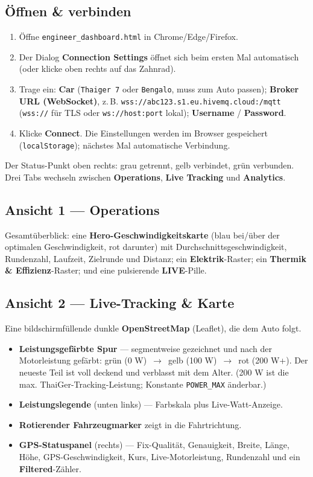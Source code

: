 \documentclass[11pt,a4paper,oneside]{report}
\newcommand{\arrow}{\,$\rightarrow$\,}
\newcommand{\code}[1]{\texttt{#1}}
\begin{document}
\subsection{\"Offnen \& verbinden}
\begin{enumerate}
  \item \"Offne \code{engineer\_dashboard.html} in Chrome/Edge/Firefox.
  \item Der Dialog \textbf{Connection Settings} \"offnet sich beim ersten Mal
    automatisch (oder klicke oben rechts auf das Zahnrad).
  \item Trage ein: \textbf{Car} (\code{Thaiger 7} oder \code{Bengalo}, muss zum
    Auto passen); \textbf{Broker URL (WebSocket)}, z.\,B.
    \code{wss://abc123.s1.eu.hivemq.cloud:/mqtt} (\code{wss://} f\"ur TLS oder
    \code{ws://host:port} lokal); \textbf{Username} / \textbf{Password}.
  \item Klicke \textbf{Connect}. Die Einstellungen werden im Browser gespeichert
    (\code{localStorage}); n\"achstes Mal automatische Verbindung.
\end{enumerate}
Der Status-Punkt oben rechts: grau getrennt, gelb verbindet, gr\"un verbunden. Drei
Tabs wechseln zwischen \textbf{Operations}, \textbf{Live Tracking} und
\textbf{Analytics}.

\subsection{Ansicht 1 --- Operations}
Gesamt\"uberblick: eine \textbf{Hero-Geschwindigkeitskarte} (blau bei/\"uber der
optimalen Geschwindigkeit, rot darunter) mit Durchschnittsgeschwindigkeit,
Rundenzahl, Laufzeit, Zielrunde und Distanz; ein \textbf{Elektrik}-Raster; ein
\textbf{Thermik \& Effizienz}-Raster; und eine pulsierende \textbf{LIVE}-Pille.

\subsection{Ansicht 2 --- Live-Tracking \& Karte}
Eine bildschirmf\"ullende dunkle \textbf{OpenStreetMap} (Leaflet), die dem Auto
folgt.
\begin{itemize}
  \item \textbf{Leistungsgef\"arbte Spur} --- segmentweise gezeichnet und nach der
    Motorleistung gef\"arbt: \textcolor{tgreen}{gr\"un (0 W)} \arrow{}
    \textcolor{tamber}{gelb (100 W)} \arrow{} \textcolor{tred}{rot (200 W+)}. Der
    neueste Teil ist voll deckend und verblasst mit dem Alter. (200 W ist die max.
    ThaiGer-Tracking-Leistung; Konstante \code{POWER\_MAX} \"anderbar.)
  \item \textbf{Leistungslegende} (unten links) --- Farbskala plus Live-Watt-Anzeige.
  \item \textbf{Rotierender Fahrzeugmarker} zeigt in die Fahrtrichtung.
  \item \textbf{GPS-Statuspanel} (rechts) --- Fix-Qualit\"at, Genauigkeit, Breite,
    L\"ange, H\"ohe, GPS-Geschwindigkeit, Kurs, Live-Motorleistung, Rundenzahl und
    ein \textbf{Filtered}-Z\"ahler.
\end{itemize}
\end{document}
